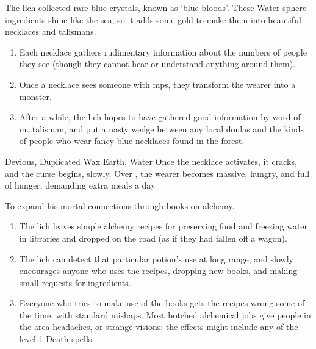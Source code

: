 \begin{multicols}{2}
\begin{dlist}
  The \gls{lich} collected rare blue crystals, known as `blue-bloods'.
  These Water \gls{sphere} \glspl{ingredient} shine like the sea, so it adds some gold to make them into beautiful necklaces and \glspl{talisman}.
  \begin{enumerate}
    \item
    Each necklace gathers rudimentary information about the numbers of people they see (though they cannot hear or understand anything around them).
    \item
    Once a necklace sees someone with \glspl{mp}, they transform the wearer into a monster.
    \item
    After a while, the \gls{lich} hopes to have gathered good information by word-of-m\ldots \gls{talisman}, and put a nasty wedge between any local \glspl{doula} and the kinds of people who wear fancy blue necklaces found in the forest.
  \end{enumerate}
      {Devious, Duplicated}%
      {Wax}%
      {Earth, Water}%
      {}%
      {Once the necklace activates, it cracks, and the curse begins, slowly.
      Over \showOnset, the wearer becomes massive, hungry, and full of hunger, demanding  extra meals a day}%
      {}%
    \showTalisman
  \item
  To expand his mortal connections through books on \gls{alchemy}.
  \begin{enumerate}
    \item
    The \gls{lich} leaves simple \gls{alchemy} recipes for preserving food and freezing water in libraries and dropped on the road (as if they had fallen off a wagon).
    \item
    The \gls{lich} can detect that particular potion's use at long range, and slowly encourages anyone who uses the recipes, dropping new books, and making small requests for \glspl{ingredient}.
    \item
    Everyone who tries to make use of the books gets the recipes wrong some of the time, with standard mishaps.
    Most botched alchemical jobs give people in the area headaches, or strange visions; the effects might include any of the level 1 Death spells.%
  \end{enumerate}
\end{dlist}

\end{multicols}

